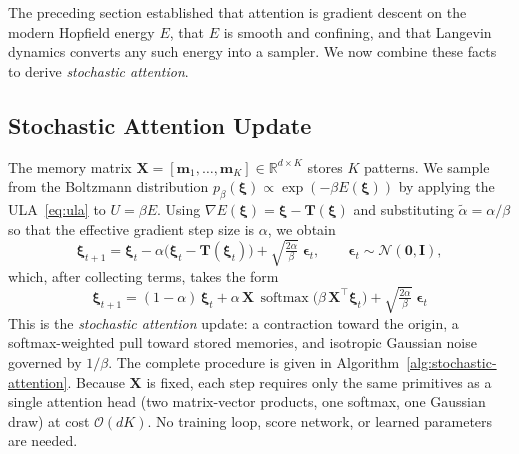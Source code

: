 
The preceding section established that attention is gradient descent on the modern Hopfield energy $E$, that $E$ is smooth and confining, and that Langevin dynamics converts any such energy into a sampler. We now combine these facts to derive \emph{stochastic attention}.

\subsection{Stochastic Attention Update}
The memory matrix $\mathbf{X}=[\mathbf{m}_1,\dots,\mathbf{m}_K]\in\mathbb{R}^{d\times K}$ stores $K$ patterns. We sample from the Boltzmann distribution $p_\beta(\boldsymbol{\xi})\propto\exp(-\beta E(\boldsymbol{\xi}))$ by applying the ULA~\eqref{eq:ula} to $U=\beta E$. Using $\nabla E(\boldsymbol{\xi})=\boldsymbol{\xi}-\mathbf{T}(\boldsymbol{\xi})$ and substituting $\tilde\alpha=\alpha/\beta$ so that the effective gradient step size is $\alpha$, we obtain
\begin{equation}\label{eq:stochastic-attention}
    \boldsymbol{\xi}_{t+1}
    = \boldsymbol{\xi}_t
      - \alpha\bigl(\boldsymbol{\xi}_t - \mathbf{T}(\boldsymbol{\xi}_t)\bigr)
      + \sqrt{\tfrac{2\alpha}{\beta}}\;\boldsymbol{\epsilon}_t,
    \qquad \boldsymbol{\epsilon}_t\sim\mathcal{N}(\mathbf{0},\mathbf{I}),
\end{equation}
which, after collecting terms, takes the form
\begin{equation}\label{eq:stochastic-attention-expanded}
    \boxed{\;
    \boldsymbol{\xi}_{t+1}
    = (1-\alpha)\,\boldsymbol{\xi}_t
      + \alpha\,\mathbf{X}\,\operatorname{softmax}\!\bigl(\beta\,\mathbf{X}^{\top}\boldsymbol{\xi}_t\bigr)
      + \sqrt{\tfrac{2\alpha}{\beta}}\;\boldsymbol{\epsilon}_t
    \;}
\end{equation}
This is the \emph{stochastic attention} update: a contraction toward the origin, a softmax-weighted pull toward stored memories, and isotropic Gaussian noise governed by $1/\beta$. The complete procedure is given in Algorithm~\ref{alg:stochastic-attention}. Because $\mathbf{X}$ is fixed, each step requires only the same primitives as a single attention head (two matrix-vector products, one softmax, one Gaussian draw) at cost $\mathcal{O}(dK)$. No training loop, score network, or learned parameters are needed.

